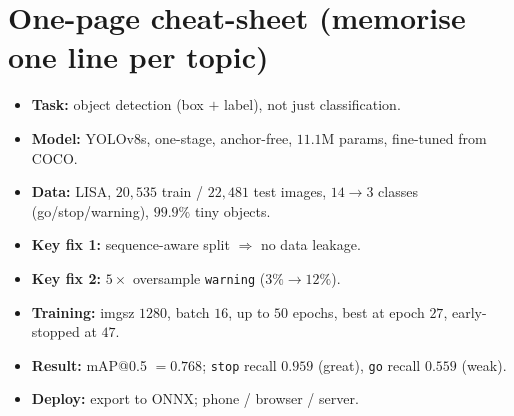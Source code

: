 \section{One-page cheat-sheet (memorise one line per topic)}
\begin{keyconcept}
\begin{itemize}
  \item \textbf{Task:} object detection (box $+$ label), not just
        classification.
  \item \textbf{Model:} YOLOv8s, one-stage, anchor-free, $11.1$M params,
        fine-tuned from COCO.
  \item \textbf{Data:} LISA, $20{,}535$ train / $22{,}481$ test images,
        $14\to3$ classes (go/stop/warning), $99.9\%$ tiny objects.
  \item \textbf{Key fix 1:} sequence-aware split $\Rightarrow$ no data
        leakage.
  \item \textbf{Key fix 2:} $5\times$ oversample \texttt{warning}
        ($3\%\to12\%$).
  \item \textbf{Training:} imgsz $1280$, batch $16$, up to $50$ epochs,
        best at epoch $27$, early-stopped at $47$.
  \item \textbf{Result:} mAP@0.5 $=0.768$; \texttt{stop} recall $0.959$
        (great), \texttt{go} recall $0.559$ (weak).
  \item \textbf{Deploy:} export to ONNX; phone / browser / server.
\end{itemize}
\end{keyconcept}


